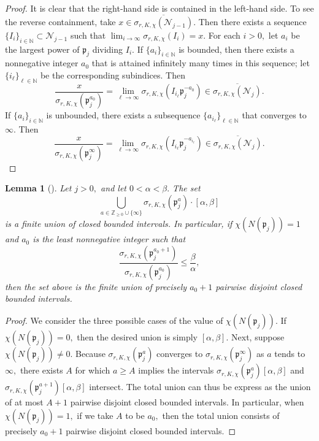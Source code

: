 \documentclass[12pt]{amsart}
\newtheorem{lemma}[theorem]{Lemma}
\theoremstyle{definition}
\numberwithin{equation}{section}
\newcommand{\p}{\mathfrak{p}}
\newcommand{\Z}{\mathbb{Z}}
\newcommand{\N}{\mathbb{N}}
\begin{document}
\begin{proof}
    It is clear that the right-hand side is contained in the left-hand side. To see the reverse containment, take $x \in \overline{\sigma_{r,K,\chi}(\mathcal{N}_{j-1})}.$ Then there exists a sequence $\{I_i\}_{i \in \N} \subset \mathcal{N}_{j-1}$ such that $\lim_{i \rightarrow \infty} \sigma_{r,K,\chi}(I_i) = x.$ For each $i > 0,$ let $a_i$ be the largest power of $\p_j$ dividing $I_i.$ If $\{a_i\}_{i \in \N}$ is bounded, then there exists a nonnegative integer $a_0$ that is attained infinitely many times in this sequence; let $\{i_\ell\}_{\ell \in \N}$ be the corresponding subindices. Then $$\frac{x}{\sigma_{r,K,\chi}(\p_j^{a_0})} = \lim_{\ell \rightarrow \infty} \sigma_{r,K,\chi}\left( I_{i_\ell} \p_j^{-a_0}\right) \in \overline{\sigma_{r,K,\chi}(\mathcal{N}_j)}.$$ If $\{a_i\}_{i \in \N}$ is unbounded, there exists a subsequence $\{a_{i_\ell}\}_{\ell \in \N}$ that converges to $\infty.$ Then $$\frac{x}{\sigma_{r,K,\chi}(\p_j^\infty)} = \lim_{\ell \rightarrow \infty} \sigma_{r,K,\chi}(I_{i_\ell} \p_j^{-a_{i_\ell}}) \in \overline{\sigma_{r,K,\chi}(\mathcal{N}_j)}.$$
\end{proof}

\begin{lemma} [{\cite[Lemma 2.5]{S17}}] \label{finiteness-last}
    Let $j > 0,$ and let $0 < \alpha < \beta.$  The set $$\bigcup_{a \in \Z_{\geq 0} \cup \{\infty\}} \sigma_{r,K,\chi}(\p_j^a) \cdot [\alpha,\beta]$$ is a finite 
    union of closed bounded intervals. In particular, if $\chi(N(\mathfrak p_j)) = 1$ and  $a_0$ is the least nonnegative integer such that $$\frac{\sigma_{r,K,\chi}(\p_j^{a_0+1})}{\sigma_{r,K,\chi}(\p_j^{a_0})} \leq \frac{\beta}{\alpha},$$ then the set above is the finite union of precisely $a_0+1$ pairwise disjoint closed bounded intervals. 
\end{lemma}

\begin{proof}
    We consider the three possible cases of the value of $\chi(N(\mathfrak p_j)).$ If $\chi(N(\mathfrak p_j)) = 0,$ then the desired union is simply $[\alpha,\beta].$ Next, suppose $\chi(N(\mathfrak p_j)) \neq 0.$ Because $\sigma_{r,K,\chi}(\mathfrak p_j^a)$ converges to $\sigma_{r,K,\chi}(\mathfrak p_j^\infty)$ as $a$ tends to $\infty,$ there exists $A$ for which $a \geq A$ implies the intervals $\sigma_{r,K,\chi}(\mathfrak p_j^a)[\alpha,\beta]$ and $\sigma_{r,K,\chi}(\mathfrak p_j^{a+1})[\alpha,\beta]$ intersect. The total union can thus be express as the union of at most $A+1$ pairwise disjoint closed bounded intervals. In particular, when $\chi(N(\mathfrak p_j)) = 1,$ if we take $A$ to be $a_0,$ then the total union consists of precisely $a_0+1$ pairwise disjoint closed bounded intervals. 
\end{proof}
\end{document}
